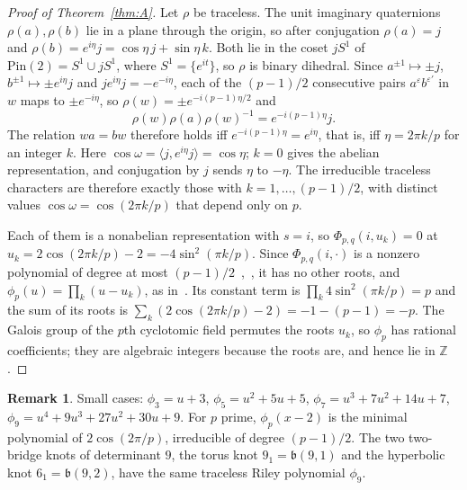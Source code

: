 \documentclass[11pt,reqno]{amsart}
\theoremstyle{plain}
\theoremstyle{definition}
\newtheorem{remark}[theorem]{Remark}
\newcommand{\Z}{\mathbb{Z}}
\newcommand{\Pin}{\mathrm{Pin}(2)}
\newcommand{\bp}{\mathfrak{b}}
\begin{document}
\begin{proof}[Proof of Theorem~\ref{thm:A}]
Let $\rho$ be traceless. The unit imaginary quaternions $\rho(a),\rho(b)$ lie in a plane through the
origin, so after conjugation $\rho(a)=j$ and $\rho(b)=e^{i\eta}j=\cos\eta\,j+\sin\eta\,k$. Both lie
in the coset $jS^1$ of $\Pin=S^1\cup jS^1$, where $S^1=\{e^{it}\}$, so $\rho$ is binary dihedral. Since
$a^{\pm1}\mapsto\pm j$, $b^{\pm1}\mapsto\pm e^{i\eta}j$ and $je^{i\eta}j=-e^{-i\eta}$, each of the
$(p-1)/2$ consecutive pairs $a^{\varepsilon}b^{\varepsilon'}$ in $w$ maps to $\pm e^{-i\eta}$, so
$\rho(w)=\pm e^{-i(p-1)\eta/2}$ and
\[
\rho(w)\rho(a)\rho(w)^{-1}=e^{-i(p-1)\eta}j.
\]
The relation $wa=bw$ therefore holds iff $e^{-i(p-1)\eta}=e^{i\eta}$, that is, iff
$\eta=2\pi k/p$ for an integer $k$. Here $\cos\omega=\langle j,e^{i\eta}j\rangle=\cos\eta$;
$k=0$ gives the abelian representation, and conjugation by $j$ sends $\eta$ to $-\eta$. The
irreducible traceless characters are therefore exactly those with $k=1,\dots,(p-1)/2$, with distinct
values $\cos\omega=\cos(2\pi k/p)$ that depend only on $p$.

Each of them is a nonabelian representation with $s=i$, so $\Phi_{p,q}(i,u_k)=0$ at
$u_k=2\cos(2\pi k/p)-2=-4\sin^2(\pi k/p)$. Since $\Phi_{p,q}(i,\cdot)$ is a nonzero polynomial of degree
at most $(p-1)/2$~\cite{Riley},~\cite[Thm.~7.6]{NY}, it has no other roots, and
$\phi_p(u)=\prod_k(u-u_k)$, as in~\cite[Thm.~7.6]{NY}. Its constant term is $\prod_k 4\sin^2(\pi k/p)=p$
and the sum of its roots is $\sum_k(2\cos(2\pi k/p)-2)=-1-(p-1)=-p$. The Galois group of the $p$th
cyclotomic field permutes the roots $u_k$, so $\phi_p$ has rational coefficients; they are algebraic
integers because the roots are, and hence lie in $\Z$.
\end{proof}

\begin{remark}
Small cases: $\phi_3=u+3$, $\phi_5=u^2+5u+5$, $\phi_7=u^3+7u^2+14u+7$, $\phi_9=u^4+9u^3+27u^2+30u+9$. For
$p$ prime, $\phi_p(x-2)$ is the minimal polynomial of $2\cos(2\pi/p)$, irreducible of degree $(p-1)/2$.
The two two-bridge knots of determinant $9$, the torus knot $9_1=\bp(9,1)$ and the hyperbolic knot
$6_1=\bp(9,2)$, have the same traceless Riley polynomial $\phi_9$.
\end{remark}
\end{document}
